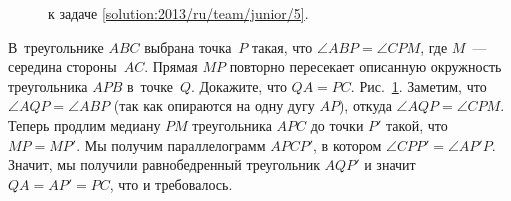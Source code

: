 \ifsolution
\begin{figure}\centering
    \caption{к задаче \ref{solution:2013/ru/team/junior/5}.}
    \label{fig:solution:2013/ru/team/junior/5}
\end{figure}
\fi %

\problem{}
В~треугольнике $ABC$ выбрана точка~$P$ такая, что $\angle ABP = \angle CPM$,
где $M$~--- середина стороны~$AC$.
Прямая $MP$ повторно пересекает описанную окружность треугольника $APB$
в~точке~$Q$.
Докажите, что $QA = PC$.
\solution
\label{solution:2013/ru/team/junior/5}
Рис.~\ref{fig:solution:2013/ru/team/junior/5}.
Заметим, что $\angle AQP = \angle ABP$ (так как опираются на одну дугу $AP$),
откуда $\angle AQP = \angle CPM$.
Теперь продлим медиану $PM$ треугольника $APC$ до точки $P'$ такой, что
$MP = MP'$.
Мы получим параллелограмм $APCP'$, в котором $\angle CPP' = \angle AP'P$.
Значит, мы получили равнобедренный треугольник $AQP'$ и значит $QA = AP' = PC$,
что и требовалось. 
\endproblem
